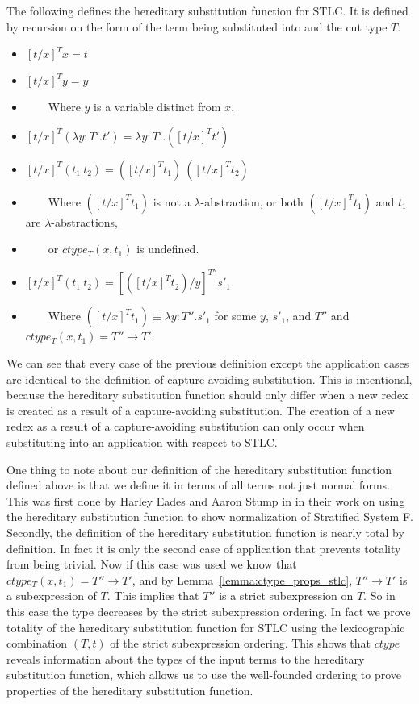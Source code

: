 \documentclass{article}
\begin{document}
\begin{definition}
  \label{def:hereditary_substitution_function_stlc}
  The following defines the hereditary substitution function for STLC.  It
  is defined by recursion on the form of the term being substituted
  into and the cut type $T$.
  \begin{itemize}
  \item[] $[t/x]^T x = t$
  \item[] $[t/x]^T y = y$
  \item[] \ \ \ \ Where $y$ is a variable distinct from $x$.
  \item[] $[t/x]^T (\lambda y:T'.t') = \lambda y:T'.([t/x]^T t')$
  \item[] $[t/x]^T (t_1\ t_2) = ([t/x]^T t_1)\ ([t/x]^T t_2)$
  \item[] \ \ \ \ Where $([t/x]^T t_1)$ is not a $\lambda$-abstraction, or both $([t/x]^T t_1)$
    and $t_1$ are $\lambda$-abstractions,
  \item[] \ \ \ \ or $ctype_T(x,t_1)$ is undefined.
  \item[] $[t/x]^{T} (t_1\ t_2) = [([t/x]^{T} t_2)/y]^{T''} s'_1$
  \item[] \ \ \ \ Where $([t/x]^{T} t_1) \equiv \lambda y:T''.s'_1$ 
    for some $y$, $s'_1$, and $T''$ and $ctype_T(x,t_1) = T'' \to T'$.
  \end{itemize}
\end{definition}
We can see that every case of the previous definition except the
application cases are identical to the definition of capture-avoiding
substitution.  This is intentional, because the hereditary
substitution function should only differ when a new redex is created
as a result of a capture-avoiding substitution.  The creation of a new
redex as a result of a capture-avoiding substitution can only occur
when substituting into an application with respect to STLC.  

One thing to note about our definition of the hereditary substitution
function defined above is that we define it in terms of all terms not
just normal forms.  This was first done by Harley Eades and Aaron
Stump in \cite{Eades:2010} in their work on using the hereditary
substitution function to show normalization of Stratified System F.
Secondly, the definition of the hereditary substitution function is
nearly total by definition.  In fact it is only the second case of
application that prevents totality from being trivial.  Now if this
case was used we know that $ctype_T(x,t_1) = T'' \to T'$, and by
Lemma~\ref{lemma:ctype_props_stlc}, $T'' \to T'$ is a subexpression of
$T$. This implies that $T''$ is a strict subexpression on $T$.  So in
this case the type decreases by the strict subexpression ordering.  In
fact we prove totality of the hereditary substitution function for
STLC using the lexicographic combination $(T, t)$ of the strict
subexpression ordering.  This shows that $ctype$ reveals information
about the types of the input terms to the hereditary substitution
function, which allows us to use the well-founded ordering to prove
properties of the hereditary substitution function.  
\end{document}

